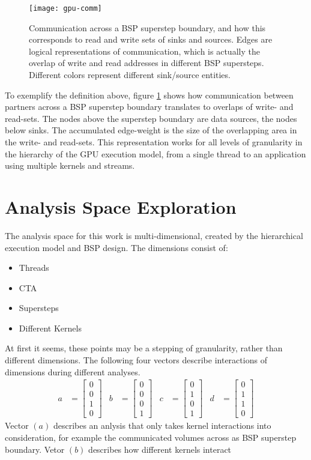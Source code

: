 \begin{figure}[t]
	\centering
	\texttt{[image: gpu-comm]}
	\caption{Communication across a BSP superstep boundary, and how this corresponds to read and write sets 
	of sinks and sources. Edges are logical representations of communication, which is actually the overlap of write and read addresses in different BSP supersteps. Different colors represent different sink/source entities.}
	\label{gpu-comm}
\end{figure} 
To exemplify the definition above, figure \ref{gpu-comm} shows how communication between partners across a 
BSP superstep boundary translates to overlaps of write- and read-sets. The nodes above the superstep boundary are data sources, the nodes below sinks. The accumulated edge-weight is the size of the 
overlapping area in the write- and read-sets. 
This representation works for all levels of granularity in the hierarchy of the GPU execution model, from a single thread to an application using multiple kernels and streams.

\section{Analysis Space Exploration}

The analysis space for this work is multi-dimensional, created by the hierarchical execution model and BSP design.
The dimensions consist of:
\begin{itemize}
	\item Threads
	\item CTA
	\item Supersteps
	\item Different Kernels
\end{itemize}
At first it seems, these points may be a stepping of granularity, rather than different dimensions. The following four vectors describe interactions of dimensions during different analyses.
 \begin{align}
a &= \begin{bmatrix}
0 \\
0 \\
1\\
0
\end{bmatrix} &
b &= \begin{bmatrix}
0 \\
0 \\
0\\
1
\end{bmatrix} &
c &= \begin{bmatrix}
0 \\
1 \\
0\\
1
\end{bmatrix} &
d &= \begin{bmatrix}
0 \\
1 \\
1\\
0
\end{bmatrix}
\end{align}
Vector $(a)$ describes an anlysis that only takes kernel interactions into consideration, for example the communicated volumes across as BSP superstep boundary. Vetor $(b)$ describes how different kernels interact 
